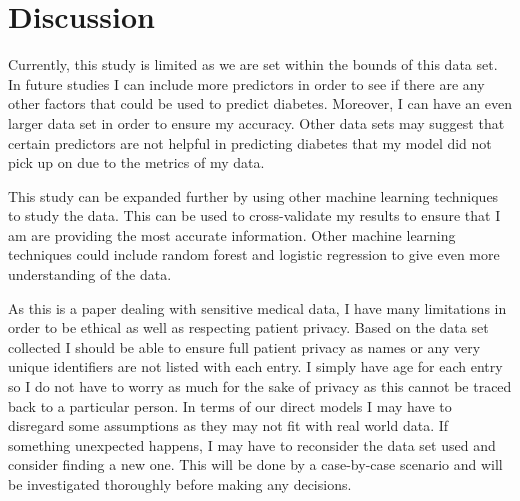 \documentclass[12pt]{article}
\begin{document}
\section{Discussion}
\label{sec:disc}

Currently, this study is limited as we are set within the bounds of this data set. In future studies I can include more predictors in 
order to see if there are any other factors that could be used to predict diabetes. Moreover, I can have an even larger data set in order to 
ensure my accuracy. Other data sets may suggest that certain predictors are not helpful in predicting diabetes that my model did not pick 
up on due to the metrics of my data. 

This study can be expanded further by using other machine learning techniques to study the data. This can be used to cross-validate my results to ensure
that I am are providing the most accurate information. Other machine learning techniques could include random forest and logistic regression to give even more
understanding of the data.

As this is a paper dealing with sensitive medical data, I have many limitations in order to be ethical as well as respecting patient 
privacy. Based on the data set collected I should be able to ensure full patient privacy as names or any very unique identifiers 
are not listed with each entry. I simply have age for each entry so I do not have to worry as much for the sake of privacy as this cannot be traced
back to a particular person. In terms of our direct models I may have to disregard some assumptions as they may not fit with real world data. If something unexpected 
happens, I may have to reconsider the data set used and consider finding a new one. This will be done by a case-by-case scenario and will 
be investigated thoroughly before making any decisions.



\end{document}
